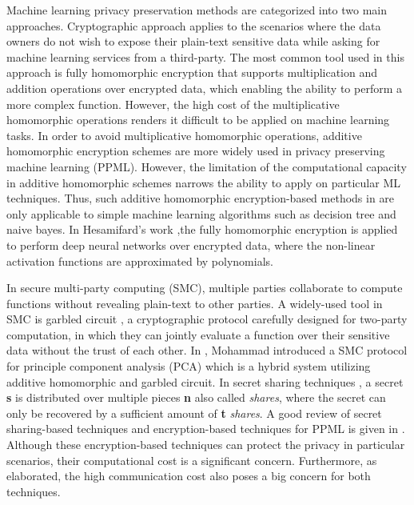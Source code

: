 
Machine learning privacy preservation methods are categorized into two main approaches. Cryptographic approach applies to the scenarios where the data owners do not wish to expose their plain-text sensitive data while asking for machine learning services from a third-party. The most common tool used in this approach is fully homomorphic encryption that supports multiplication and addition operations over encrypted data, which enabling the ability to perform a more complex function. However, the high cost of the multiplicative homomorphic operations renders it difficult to be applied on machine learning tasks. In order to avoid multiplicative homomorphic operations, additive homomorphic encryption schemes are more widely used in privacy preserving machine learning (PPML). However, the limitation of the computational capacity in additive homomorphic schemes narrows the ability to apply on particular ML techniques. Thus, such additive homomorphic encryption-based methods in \cite{Bost2015,Emekci2007,Raphael,Hesamifard}  are only applicable to simple machine learning algorithms such as decision tree and naive bayes. In Hesamifard's work \cite{Hesamifard2017},the fully homomorphic encryption is applied to perform deep neural networks over encrypted data, where the non-linear activation functions are approximated by polynomials. 
  
In secure multi-party computing (SMC), multiple parties collaborate to compute functions without revealing plain-text to other parties. A widely-used tool in SMC is garbled circuit \cite{Yao1986}, a cryptographic protocol carefully designed for two-party computation, in which they can jointly evaluate a function over their sensitive data without the trust of each other. In \cite{Al-rubaie}, Mohammad introduced a SMC protocol for principle component analysis (PCA) which is a hybrid system utilizing additive homomorphic and garbled circuit. In secret sharing techniques \cite{Shamir1979}, a secret \textbf{s} is distributed over multiple pieces \textbf{n} also called \textit{shares}, where the secret can only be recovered by a sufficient amount of \textbf{t} \textit{shares}. A good review of secret sharing-based techniques and encryption-based techniques for PPML is given in \cite{Pedersen2007}. Although these encryption-based techniques can protect the privacy in particular scenarios, their computational cost is a significant concern. Furthermore, as \cite{Pedersen2007} elaborated, the high communication cost also poses a big concern for both techniques.
      
